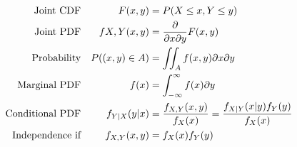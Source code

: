 
\begin{slide}
\begin{align*}
\text{Joint CDF} &&F(x,y) &= P(X\leq x, Y\leq y)\\
\text{Joint PDF} &&f{X,Y}(x,y) &= {\partial \over \partial x \partial y}F(x,y)\\
\text{Probability} &&P((x,y)\in A)&=\iint_{A}f(x,y)\partial x\partial y\\
\text{Marginal PDF} &&f(x) &= \int_{-\infty}^{\infty}f(x)\partial y\\
\text{Conditional PDF} &&f_{Y|X}(y|x) &= {f_{X,Y}(x,y) \over f_{X}(x)} = {f_{X|Y}(x|y)  f_{Y}(y) \over f_{X}(x)}\\
\text{Independence if} &&f_{X,Y}(x,y) &= f_{X}(x)f_{Y}(y)
\end{align*}
\end{slide}